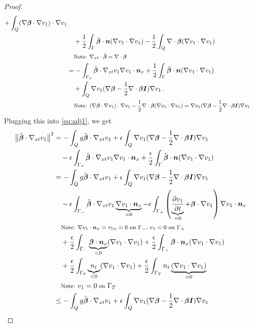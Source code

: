 \documentclass[Dissertation.tex]{subfiles}
\begin{document}
\begin{proof}
\begin{align*}
+\int_Q(\Grad\bfbeta\cdot\Grad v_1)\cdot\Grad v_1
\\&\quad
+\frac{1}{2}\int_\Gamma\tilde\bfbeta\cdot\bfn(\Grad v_1\cdot\Grad v_1)
-\frac{1}{2}\int_Q\Div\bfbeta(\Grad v_1\cdot\Grad v_1)\\
&\quad\footnotesize{\text{Note: }\Divxt\tilde\bfbeta=\Div\bfbeta}
\\
%
&=-\int_{\Gamma_x}\tilde\bfbeta\cdot\Gradxt v_1\Grad v_1\cdot\bfn_x
+\frac{1}{2}\int_\Gamma\tilde\bfbeta\cdot\bfn(\Grad v_1\cdot\Grad v_1)
\\&\quad
+\int_Q\Grad v_1(\Grad\bfbeta-\frac{1}{2}\Div\bfbeta\bfI)\Grad v_1\,.\\
&\quad\footnotesize{\text{Note: }(\Grad\bfbeta\cdot\Grad v_1)\cdot\Grad v_1-\frac{1}{2}\Div\bfbeta(\Grad v_1\cdot\Grad v_1)=\Grad v_1(\Grad\bfbeta-\frac{1}{2}\Div\bfbeta\bfI)\Grad v_1}
\end{align*}
Plugging this into \eqref{eq:adj1}, we get
\begin{align*}
\norm{\tilde\bfbeta\cdot\Gradxt v_1}^2
&=-\int_Q g\tilde\bfbeta\cdot\Gradxt v_1
+\epsilon\int_Q\Grad v_1(\Grad\bfbeta-\frac{1}{2}\Div\bfbeta\bfI)\Grad v_1\\
&\quad-\epsilon\int_{\Gamma_x}\tilde\bfbeta\cdot\Gradxt v_1\Grad v_1\cdot\bfn_x
+\frac{\epsilon}{2}\int_\Gamma\tilde\bfbeta\cdot\bfn(\Grad v_1\cdot\Grad v_1)\\
%
&=-\int_Q g\tilde\bfbeta\cdot\Gradxt v_1
+\epsilon\int_Q\Grad v_1(\Grad\bfbeta-\frac{1}{2}\Div\bfbeta\bfI)\Grad v_1\\
&\quad
-\epsilon\int_{\Gamma_-}\tilde\bfbeta\cdot\Gradxt v_1\underbrace{\Grad v_1\cdot\bfn_x}_{=0}
-\epsilon\int_{\Gamma_+}\LRp{\underbrace{\pd{v_1}{t}}_{=0}+\bfbeta\cdot\Grad v_1}\Grad v_1\cdot\bfn_x\\
&\quad\footnotesize{\text{Note: }\Grad v_1\cdot\bfn_x=\tau_{1n}=0\text{ on }\Gamma_-\text{, }v_1=0\text{ on }\Gamma_+}
\\
&\quad
+\frac{\epsilon}{2}\int_{\Gamma_-}\underbrace{\bfbeta\cdot\bfn_x}_{<0}(\Grad v_1\cdot\Grad v_1)
+\frac{\epsilon}{2}\int_{\Gamma_+}\bfbeta\cdot\bfn_x(\Grad v_1\cdot\Grad v_1)\\
&\quad
+\frac{\epsilon}{2}\int_{\Gamma_0}\underbrace{n_t}_{<0}(\Grad v_1\cdot\Grad v_1)
+\frac{\epsilon}{2}\int_{\Gamma_T}n_t\underbrace{(\Grad v_1\cdot\Grad v_1)}_{=0}\\
&\quad\footnotesize{\text{Note: }v_1=0\text{ on }\Gamma_T}
\\
%
&\leq-\int_Q g\tilde\bfbeta\cdot\Gradxt v_1
+\epsilon\int_Q\Grad v_1(\Grad\bfbeta-\frac{1}{2}\Div\bfbeta\bfI)\Grad v_1\\

\end{align*}
\end{proof}
\end{document}
